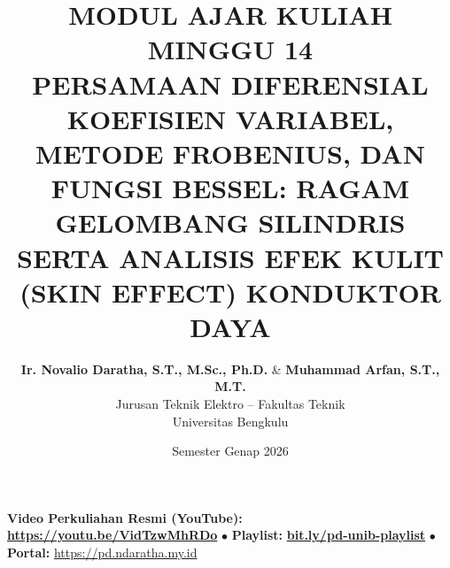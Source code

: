 \documentclass[11pt,a4paper]{article}
\title{\textbf{\Large MODUL AJAR KULIAH MINGGU 14}\\[0.3cm]
\textbf{\LARGE PERSAMAAN DIFERENSIAL KOEFISIEN VARIABEL, METODE FROBENIUS, DAN FUNGSI BESSEL: RAGAM GELOMBANG SILINDRIS SERTA ANALISIS EFEK KULIT (SKIN EFFECT) KONDUKTOR DAYA}}
\author{\textbf{Ir. Novalio Daratha, S.T., M.Sc., Ph.D.} \& \textbf{Muhammad Arfan, S.T., M.T.} \\ 
Jurusan Teknik Elektro -- Fakultas Teknik \\ 
Universitas Bengkulu}
\date{Semester Genap 2026}
\theoremstyle{definition}
\begin{document}
\maketitle
\begin{center}
  \vspace{-0.25cm}
  \begin{tcolorbox}[colback=red!4!white,colframe=red!75!black,boxrule=0.5pt,arc=2pt,left=6pt,right=6pt,top=3pt,bottom=3pt,width=0.98\textwidth]
    \centering\footnotesize
    \textbf{Video Perkuliahan Resmi (YouTube):} {\color{red!80!black}\textbf{\url{https://youtu.be/VidTzwMhRDo}}} \quad $\bullet$ \quad \textbf{Playlist:} \href{https://www.youtube.com/playlist?list=PLS5oOZWXZeTw}{\color{blue!80!black}\textbf{bit.ly/pd-unib-playlist}} \quad $\bullet$ \quad \textbf{Portal:} \url{https://pd.ndaratha.my.id}
  \end{tcolorbox}
  \vspace{-0.15cm}
\end{center}
\end{document}
